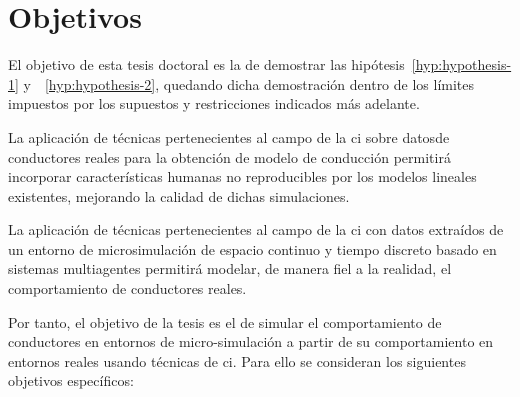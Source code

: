 \section{Objetivos}
\label{ch:intro:objectives}

El objetivo de esta tesis doctoral es la de demostrar las hipótesis~\ref{hyp:hypothesis-1} y~~\ref{hyp:hypothesis-2}, quedando dicha demostración dentro de los límites impuestos por los supuestos y restricciones indicados más adelante.

\begin{hyp} \label{hyp:first}
	\label{hyp:hypothesis-1}
	La aplicación de técnicas pertenecientes al campo de la \ac{ci} sobre datosde conductores reales para la obtención de modelo de conducción permitirá incorporar características humanas no reproducibles por los modelos lineales existentes, mejorando la calidad de dichas simulaciones.
\end{hyp}

\begin{hyp} \label{hyp:first}
	\label{hyp:hypothesis-2}
	La aplicación de técnicas pertenecientes al campo de la \ac{ci} con datos extraídos de un entorno de microsimulación de espacio continuo y tiempo discreto basado en sistemas multiagentes permitirá modelar, de manera fiel a la realidad, el comportamiento de conductores reales.
\end{hyp}

Por tanto, el objetivo de la tesis es el de simular el comportamiento de conductores en entornos de micro-simulación a partir de su comportamiento en entornos reales usando técnicas de \ac{ci}. Para ello se consideran los siguientes objetivos específicos:

